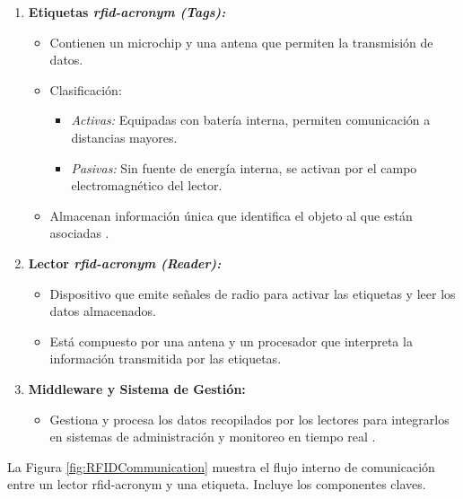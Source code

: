 \begin{enumerate}
    \item \textbf{Etiquetas \textit{\acrshort{rfid-acronym} (Tags):}}
    \begin{itemize}
        \item Contienen un microchip y una antena que permiten la transmisión de datos.
        \item Clasificación:
        \begin{itemize}
            \item \textit{Activas:} Equipadas con batería interna, permiten comunicación a distancias mayores.
            \item \textit{Pasivas:} Sin fuente de energía interna, se activan por el campo electromagnético del lector.
        \end{itemize}
        \item Almacenan información única que identifica el objeto al que están asociadas \cite{RFidtech}.
    \end{itemize}
    \item \textbf{Lector \textit{\acrshort{rfid-acronym} (Reader):}}
    \begin{itemize}
        \item Dispositivo que emite señales de radio para activar las etiquetas y leer los datos almacenados.
        \item Está compuesto por una antena y un procesador que interpreta la información transmitida por las etiquetas.
    \end{itemize}
    \item \textbf{Middleware y Sistema de Gestión:}
    \begin{itemize}
        \item Gestiona y procesa los datos recopilados por los lectores para integrarlos en sistemas de administración y monitoreo en tiempo real \cite{Mechanismiot}.
    \end{itemize}
\end{enumerate}

La Figura \ref{fig:RFIDCommunication} muestra el flujo interno de comunicación entre un lector \acrshort{rfid-acronym} y una etiqueta. Incluye los componentes claves.


